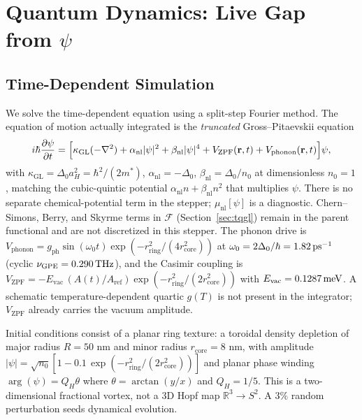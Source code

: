 \documentclass[11pt,letterpaper]{article}
\begin{document}
\section{Quantum \TQGL{} Dynamics: Live Gap from $\psi$}
\label{sec:dynamics}

\subsection{Time-Dependent Simulation}

We solve the time-dependent \TQGL{} equation using a split-step Fourier method. The equation of motion actually integrated is the \emph{truncated} Gross--Pitaevskii equation
\begin{equation}
i\hbar \frac{\partial \psi}{\partial t}
=
\Bigl[
\kappa_{\mathrm{GL}}(-\nabla^2)
+\alpha_{\mathrm{nl}}|\psi|^2
+\beta_{\mathrm{nl}}|\psi|^4
+V_{\mathrm{ZPF}}(\mathbf{r},t)
+V_{\mathrm{phonon}}(\mathbf{r},t)
\Bigr]\psi,
\label{eq:gpe_trunc}
\end{equation}
with $\kappa_{\mathrm{GL}}=\Delta_0 a_H^2=\hbar^2/(2m^*)$, $\alpha_{\mathrm{nl}}=-\Delta_0$, $\beta_{\mathrm{nl}}=\Delta_0/n_0$ at dimensionless $n_0=1$, matching the cubic-quintic potential $\alpha_{\mathrm{nl}} n+\beta_{\mathrm{nl}} n^2$ that multiplies $\psi$. There is no separate chemical-potential term in the stepper; $\mu_{\mathrm{nl}}[\psi]$ is a diagnostic. Chern--Simons, Berry, and Skyrme terms in $\mathcal{F}$ (Section~\ref{sec:tqgl}) remain in the parent functional and are not discretized in this stepper. The phonon drive is $V_{\text{phonon}} = g_{\text{ph}} \sin(\omega_0 t) \exp(-r_{\text{ring}}^2/(4r_{\text{core}}^2))$ at $\omega_0 = 2\Delta_0/\hbar=1.82\,\mathrm{ps}^{-1}$ (cyclic $\nu_{\mathrm{GPE}}=0.290\,\mathrm{THz}$), and the Casimir coupling is $V_{\text{ZPF}} = -E_{\mathrm{vac}}\,(A(t)/A_{\mathrm{ref}})\exp(-r_{\text{ring}}^2/(2r_{\text{core}}^2))$ with $E_{\mathrm{vac}}=0.1287\,\mathrm{meV}$. A schematic temperature-dependent quartic $g(T)$ is not present in the integrator; $V_{\mathrm{ZPF}}$ already carries the vacuum amplitude.

Initial conditions consist of a planar ring texture: a toroidal density depletion of major radius $R = 50$ nm and minor radius $r_{\text{core}} = 8$ nm, with amplitude $|\psi| = \sqrt{n_0} [1 - 0.1\,\exp(-r_{\text{ring}}^2/(2r_{\text{core}}^2))]$ and planar phase winding $\arg(\psi) = Q_H \theta$ where $\theta = \arctan(y/x)$ and $Q_H = 1/5$. This is a two-dimensional fractional vortex, not a 3D Hopf map $\mathbb{R}^3\to S^2$. A $3\%$ random perturbation seeds dynamical evolution.
\end{document}
